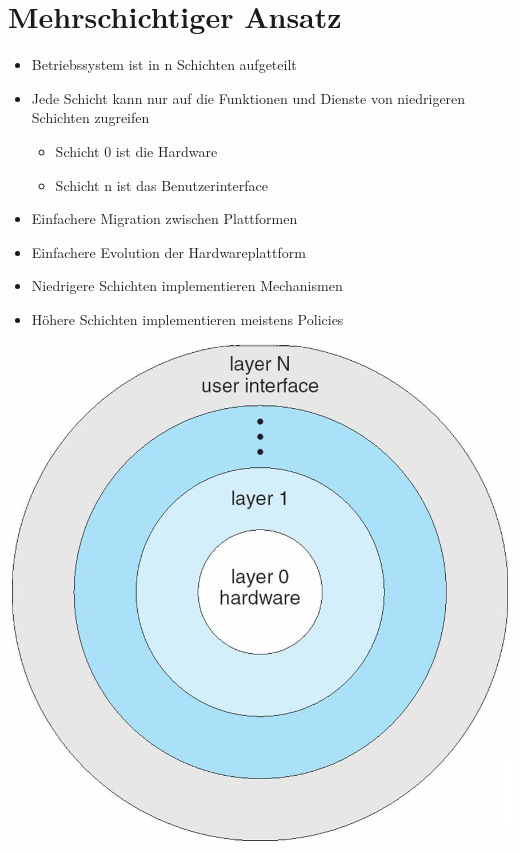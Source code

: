 \documentclass[a4paper]{scrreprt}
\begin{document}
\section{Mehrschichtiger Ansatz}
	\begin{itemize}
		\item Betriebssystem ist in n Schichten aufgeteilt
		\item Jede Schicht kann nur auf die Funktionen und Dienste von niedrigeren Schichten zugreifen 
			\begin{itemize} 
				\item Schicht 0 ist die Hardware
				\item Schicht n ist das Benutzerinterface
			\end{itemize}
		\item Einfachere Migration zwischen Plattformen
		\item Einfachere Evolution der Hardwareplattform
		\item Niedrigere Schichten implementieren Mechanismen
		\item Höhere Schichten implementieren meistens Policies
	\end{itemize}

\begin{center}
\includegraphics[scale=0.15]{graphics/schichtenmodell.png}
\end{center}
\end{document}
